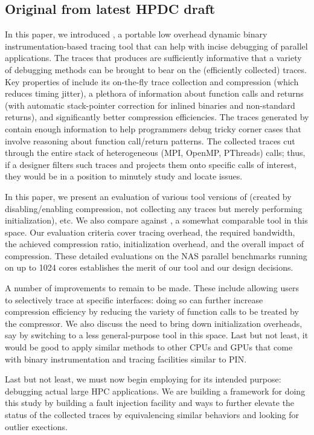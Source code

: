 \subsection{Original from latest HPDC draft}
In this paper, we introduced \parlot, a portable low overhead dynamic
binary instrumentation-based
tracing tool that can help with incise debugging of parallel applications.
%
The traces that \parlot produces are sufficiently informative that
a variety of debugging methods can be brought to bear on the
(efficiently collected) traces.
%
Key properties of \parlot include its on-the-fly trace collection and
compression (which reduces timing jitter), a plethora of information
about function calls and returns (with automatic stack-pointer 
correction for inlined binaries and non-standard returns), and
significantly better compression efficiencies.
%
The traces generated by
\parlot  contain enough information to help programmers debug
tricky corner cases that involve reasoning about function call/return
patterns.
%
The collected traces cut through the entire stack of heterogeneous
(MPI, OpenMP, PThreads) calls; thus, if a designer filters such traces
and projects them onto specific calls of interest, they would be in 
a position to minutely study and locate issues.


In this paper, we present an evaluation of various tool versions of \parlot
(created by disabling/enabling compression, not collecting any traces but
merely performing initialization), etc.
%
We also compare \parlot against \callgrind, a somewhat comparable tool
in this space.
%
Our evaluation criteria cover tracing overhead, the required bandwidth,
the achieved compression ratio, initialization overhead, and the 
overall impact of compression.
%
These detailed evaluations on the NAS parallel benchmarks running on
up to 1024 cores establishes the merit of our tool and our design
decisions.


A number of improvements to \parlot remain to be made.
%
These include allowing users to selectively trace at specific
interfaces: doing so can further increase compression efficiency
by reducing the variety of function calls to be treated by
the compressor.
%
We also discuss the need to bring down initialization overheads, say
by switching to a less general-purpose tool in this space.
%
Last but not least, it would be good to apply similar methods to
other CPUs and GPUs that come with binary instrumentation and tracing
facilities similar to PIN.


Last but not least, we must now begin employing \parlot for its
intended purpose: debugging actual large HPC applications.
%
We are  building a framework for doing this study by building
a fault injection facility and ways to further elevate the
status of the collected traces by equivalencing similar behaviors
and looking for outlier exections.

